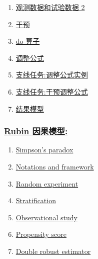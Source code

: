 \documentclass[11pt]{article}
\begin{document}
\begin{multicols}{3}
\begin{enumerate}
		\item \href{https://mp.weixin.qq.com/s/o-CXebk_5XEgsNOFgPFELQ}{观测数据和试验数据 2}	%
		\item \href{https://mp.weixin.qq.com/s/vwlbqxVd0VccyC8d9560VA}{干预}	%
		\item \href{https://mp.weixin.qq.com/s/yRsmm3m4-Gml4omoORn52Q}{do 算子}	%
		\item \href{https://mp.weixin.qq.com/s/-qLTS8iGjqj6IKS3S5GxWg}{调整公式}	%
		\item \href{https://mp.weixin.qq.com/s/SFulXDLBui7nJSZJemwYkg}{支线任务:调整公式实例}	%
		\item \href{https://mp.weixin.qq.com/s/u2cRH1uGTJoPweWrLHuEdA}{支线任务:干预调整公式}	%
		\item \href{https://mp.weixin.qq.com/s/nYpB7nC794hEPtlY8eY9WQ}{结果模型}	%
	\end{enumerate}
\end{multicols}

\newpage

\subsubsection*{\href{https://space.bilibili.com/1849098602/lists/1813948?type=season}{\kaishu Rubin 因果模型:}}

\vspace{-0.5cm}

\begin{multicols}{3}
	\begin{enumerate}
		\item \href{https://mp.weixin.qq.com/s/C7BXmpnOfWj8hdwXn_Z4qw}{Simpson's paradox}	%
		\item \href{https://mp.weixin.qq.com/s/gf6rWEu8K-3G-LnrDyWBbw}{Notations and framework}	%
		\item \href{https://mp.weixin.qq.com/s/lN5LDSpDz1xPT9uByXInyA}{Random experiment}	%
		\item \href{https://mp.weixin.qq.com/s/imTH7aS1FZvM87Ylkhk1Ow}{Stratification}	%
		\item \href{https://mp.weixin.qq.com/s/9SkcJJvwoOQ7TVpAGVndNA}{Observational study}	%
		\item \href{https://mp.weixin.qq.com/s/YmYxCi-jBc-UTOTHFOHs8Q}{Propensity score}	%
		\item \href{https://mp.weixin.qq.com/s/J8vCkGR_wR3cx1EyGg8eGA}{Double robust estimator}	%
	\end{enumerate}
\end{multicols}
\end{document}
